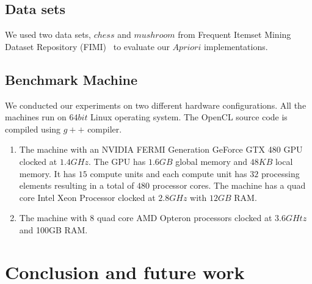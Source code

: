 \documentclass[conference]{IEEEtran}
\begin{document}
\subsection{Data sets}
We used two data sets, $chess$ and $mushroom$ from Frequent Itemset Mining Dataset Repository (FIMI)~\cite{bib:fimi} to evaluate our $Apriori$ implementations. 
\subsection{Benchmark Machine}
We conducted our experiments on two different hardware configurations. All the machines run on $64bit$ Linux operating system. The OpenCL source code is compiled using $g++$ compiler.
\begin{enumerate}
\item{The machine with an NVIDIA FERMI Generation GeForce GTX 480 GPU clocked at $1.4GHz$. The GPU has $1.6	GB$ global memory and $48 KB$ local memory. It has $15$ compute units and each compute unit has $32$ processing elements resulting in a total of $480$ processor cores. The machine has a quad core Intel Xeon Processor clocked at $2.8GHz$ with $12GB$ RAM.}
\item{The machine with $8$ quad core AMD Opteron processors clocked at $3.6GHtz$ and 100GB RAM.}
\end{enumerate} 
\section{Conclusion and future work}


%
%
\end{document}
